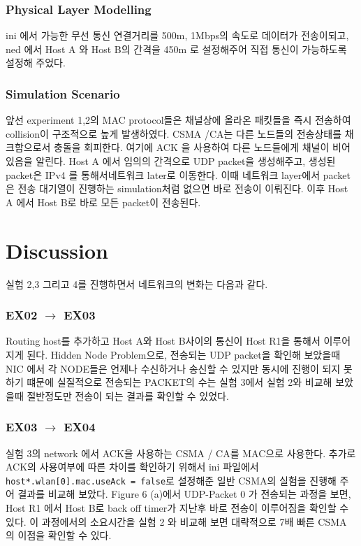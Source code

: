 \vspace{-3mm}
    \subsubsection*{Physical Layer Modelling  }
    \vspace{-2mm}
    ini 에서 가능한 무선 통신 연결거리를 500m, 1Mbps의 속도로 데이터가 전송이되고, ned 에서 Host A 와 Host B의 간격을 450m 로 설정해주어 직접 통신이 가능하도록 설정해 주었다. 
\vspace{-1mm}
    \subsubsection*{Simulation Scenario }
    \vspace{-2mm}
    앞선 experiment 1,2의 MAC  protocol들은 채널상에 올라온 패킷들을 즉시 전송하여 collision이 구조적으로 높게 발생하였다. 
    CSMA /CA는 다른 노드들의 전송상태를 채크함으로서 충돌을 회피한다. 여기에 ACK 을 사용하여 다른 노드들에게 채널이 비어있음을 알린다.
    Host A 에서 임의의 간격으로 UDP packet을 생성해주고, 생성된 packet은 IPv4 를 통해서네트워크 later로 이동한다. 이때 네트워크 layer에서 packet은 전송 대기열이 진행하는 simulation처럼 없으면 바로 전송이 이뤄진다. 이후 Host A 에서 Host B로 바로 모든 packet이 전송된다. 
\section*{Discussion}
\vspace{-3mm}
실험 2,3 그리고 4를 진행하면서 네트워크의 변화는 다음과 같다. 
\vspace{-3mm}
    \subsubsection*{EX02 $\rightarrow$ EX03}
\vspace{-2mm}
Routing host를 추가하고 Host A와 Host B사이의 통신이 Host R1을 통해서 이루어지게 된다.
Hidden Node Problem으로, 전송되는 UDP packet을 확인해 보았을때 NIC 에서 각 NODE들은 언제나 수신하거나 송신할 수 있지만 동시에 진행이 되지 못하기 떄문에 실질적으로 전송되는 PACKET의 수는 실험 3에서 실험 2와 비교해 보았을때 절반정도만 전송이 되는 결과를 확인할 수 있었다. 
\vspace{-3mm}
    \subsubsection*{EX03 $\rightarrow$ EX04}
\vspace{-2mm}
실험 3의 network 에서 ACK을 사용하는 CSMA / CA를 MAC으로 사용한다. 추가로 ACK의 사용여부에 따른 차이를 확인하기 위해서 ini 파일에서 \texttt{host*.wlan[0].mac.useAck = false}로 설정해준 일반 CSMA의 실험을 진행해 주어 결과를 비교해 보았다. Figure 6 (a)에서 UDP-Packet 0 가 전송되는 과정을 보면, Host R1 에서 Host B로 back off timer가 지난후 바로 전송이 이루어짐을 확인할 수 있다. 이 과정에서의 소요시간을 실험 2 와 비교해 보면 대략적으로 7배 빠른 CSMA 의 이점을 확인할 수 있다. 

